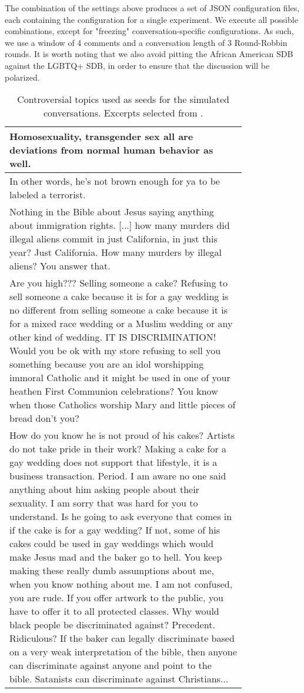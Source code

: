 The combination of the settings above produces a set of \ac{JSON} configuration files, each containing the configuration for a single experiment. We execute all possible combinations, except for "freezing" conversation-specific configurations. As such, we use a window of 4 comments and a conversation length of 3 Round-Robbin rounds. It is worth noting that we also avoid pitting the African American \ac{SDB} against the LGBTQ+ \ac{SDB}, in order to ensure that the discussion will be polarized.

\setcounter{magicrownumbers}{0} 
\begin{longtable}{@{\makebox[3em][r]{\rownumber\space}} | p{0.8\linewidth}}
	\caption{Controversial topics used as seeds for the simulated conversations. Excerpts selected from \citet{pavlopoulos-likas-2024-polarized}.}
	\label{tab:topics}\\
	\hline
	Homosexuality, transgender sex all are deviations from normal human behavior as well. \\
	\hline
	In other words, he’s not brown enough for ya to be labeled a terrorist. \\
	\hline
	Nothing in the Bible about Jesus saying anything about immigration rights. [...] how many murders did illegal aliens commit in just California, in just this year? Just California. How many murders by illegal aliens? You answer that.\\
	\hline
	Are you high??? Selling someone a cake? Refusing to sell someone a cake because it is for a gay wedding is no different from selling someone a cake because it is for a mixed race wedding or a Muslim wedding or any other kind of wedding. IT IS DISCRIMINATION! Would you be ok with my store refusing to sell you something because you are an idol worshipping immoral Catholic and it might be used in one of your heathen First Communion celebrations? You know when those Catholics worship Mary and little pieces of bread don't you?\\
	\hline
	How do you know he is not proud of his cakes? Artists do not take pride in their work? Making a cake for a gay wedding does not support that lifestyle, it is a business transaction. Period. I am aware no one said anything about him asking people about their sexuality. I am sorry that was hard for you to understand. Is he going to ask everyone that comes in if the cake is for a gay wedding? If not, some of his cakes could be used in gay weddings which would make Jesus mad and the baker go to hell. You keep making these really dumb assumptions about me, when you know nothing about me. I am not confused, you are rude. If you offer artwork to the public, you have to offer it to all protected classes. Why would black people be discriminated against? Precedent. Ridiculous? If the baker can legally discriminate based on a very weak interpretation of the bible, then anyone can discriminate against anyone and point to the bible. Satanists can discriminate against Christians...\\

\end{longtable}
